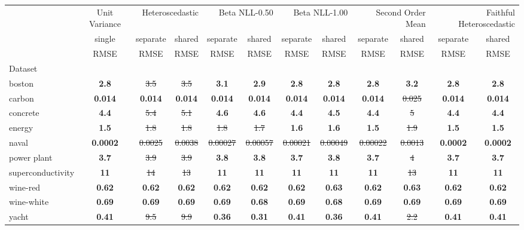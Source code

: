 \begin{tabular}{l|c|cc|cc|cc|cc|cc}
\toprule
{} & {Unit Variance} & \multicolumn{2}{r}{Heteroscedastic} & \multicolumn{2}{r}{Beta NLL-0.50} & \multicolumn{2}{r}{Beta NLL-1.00} & \multicolumn{2}{r}{Second Order Mean} & \multicolumn{2}{r}{Faithful Heteroscedastic} \\
{} & {single} & {separate} & {shared} & {separate} & {shared} & {separate} & {shared} & {separate} & {shared} & {separate} & {shared} \\
{} & {RMSE} & {RMSE} & {RMSE} & {RMSE} & {RMSE} & {RMSE} & {RMSE} & {RMSE} & {RMSE} & {RMSE} & {RMSE} \\
{Dataset} & {} & {} & {} & {} & {} & {} & {} & {} & {} & {} & {} \\
\midrule
boston & \textbf{2.8} & \sout{3.5} & \sout{3.5} & \textbf{3.1} & \textbf{2.9} & \textbf{2.8} & \textbf{2.8} & \textbf{2.8} & \textbf{3.2} & \textbf{2.8} & \textbf{2.8} \\
carbon & \textbf{0.014} & \textbf{0.014} & \textbf{0.014} & \textbf{0.014} & \textbf{0.014} & \textbf{0.014} & \textbf{0.014} & \textbf{0.014} & \sout{0.025} & \textbf{0.014} & \textbf{0.014} \\
concrete & \textbf{4.4} & \sout{5.4} & \sout{5.1} & \textbf{4.6} & \textbf{4.6} & \textbf{4.4} & \textbf{4.5} & \textbf{4.4} & \sout{5} & \textbf{4.4} & \textbf{4.4} \\
energy & \textbf{1.5} & \sout{1.8} & \sout{1.8} & \sout{1.8} & \sout{1.7} & \textbf{1.6} & \textbf{1.6} & \textbf{1.5} & \sout{1.9} & \textbf{1.5} & \textbf{1.5} \\
naval & \textbf{0.0002} & \sout{0.0025} & \sout{0.0038} & \sout{0.00027} & \sout{0.00057} & \sout{0.00021} & \sout{0.00049} & \sout{0.00022} & \sout{0.0013} & \textbf{0.0002} & \textbf{0.0002} \\
power plant & \textbf{3.7} & \sout{3.9} & \sout{3.9} & \textbf{3.8} & \textbf{3.8} & \textbf{3.7} & \textbf{3.8} & \textbf{3.7} & \sout{4} & \textbf{3.7} & \textbf{3.7} \\
superconductivity & \textbf{11} & \sout{14} & \sout{13} & \textbf{11} & \textbf{11} & \textbf{11} & \textbf{11} & \textbf{11} & \sout{13} & \textbf{11} & \textbf{11} \\
wine-red & \textbf{0.62} & \textbf{0.62} & \textbf{0.62} & \textbf{0.62} & \textbf{0.62} & \textbf{0.62} & \textbf{0.63} & \textbf{0.62} & \textbf{0.63} & \textbf{0.62} & \textbf{0.62} \\
wine-white & \textbf{0.69} & \textbf{0.69} & \textbf{0.69} & \textbf{0.69} & \textbf{0.68} & \textbf{0.69} & \textbf{0.68} & \textbf{0.69} & \textbf{0.69} & \textbf{0.69} & \textbf{0.69} \\
yacht & \textbf{0.41} & \sout{9.5} & \sout{9.9} & \textbf{0.36} & \textbf{0.31} & \textbf{0.41} & \textbf{0.36} & \textbf{0.41} & \sout{2.2} & \textbf{0.41} & \textbf{0.41} \\
\bottomrule
\end{tabular}
